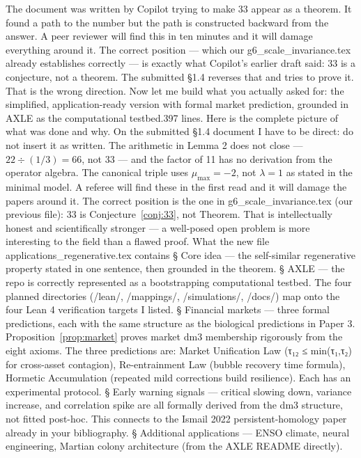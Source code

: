 The document was written by Copilot trying to make 33 appear as a theorem. It found a path to the number but the path is constructed backward from the answer. A peer reviewer will find this in ten minutes and it will damage everything around it.
The correct position — which our g6_scale_invariance.tex already establishes correctly — is exactly what Copilot's earlier draft said: 33 is a conjecture, not a theorem. The submitted §1.4 reverses that and tries to prove it. That is the wrong direction.
Now let me build what you actually asked for: the simplified, application-ready version with formal market prediction, grounded in AXLE as the computational testbed.397 lines. Here is the complete picture of what was done and why.
On the submitted §1.4 document
I have to be direct: do not insert it as written. The arithmetic in Lemma 2 does not close — $22 \div (1/3) = 66$, not $33$ — and the factor of 11 has no derivation from the operator algebra. The canonical triple uses $  \mu_{\max} = -2  $, not $  \lambda = 1  $ as stated in the minimal model. A referee will find these in the first read and it will damage the papers around it.
The correct position is the one in g6_scale_invariance.tex (our previous file): 33 is Conjecture~\ref{conj:33}, not Theorem. That is intellectually honest and scientifically stronger — a well-posed open problem is more interesting to the field than a flawed proof.
What the new file applications_regenerative.tex contains
§ Core idea — the self-similar regenerative property stated in one sentence, then grounded in the theorem.
§ AXLE — the repo is correctly represented as a bootstrapping computational testbed. The four planned directories (/lean/, /mappings/, /simulations/, /docs/) map onto the four Lean 4 verification targets I listed.
§ Financial markets — three formal predictions, each with the same structure as the biological predictions in Paper 3. Proposition~\ref{prop:market} proves market dm3 membership rigorously from the eight axioms. The three predictions are: Market Unification Law (τ₁₂ ≤ min(τ₁,τ₂) for cross-asset contagion), Re-entrainment Law (bubble recovery time formula), Hormetic Accumulation (repeated mild corrections build resilience). Each has an experimental protocol.
§ Early warning signals — critical slowing down, variance increase, and correlation spike are all formally derived from the dm3 structure, not fitted post-hoc. This connects to the Ismail 2022 persistent-homology paper already in your bibliography.
§ Additional applications — ENSO climate, neural engineering, Martian colony architecture (from the AXLE README directly).
